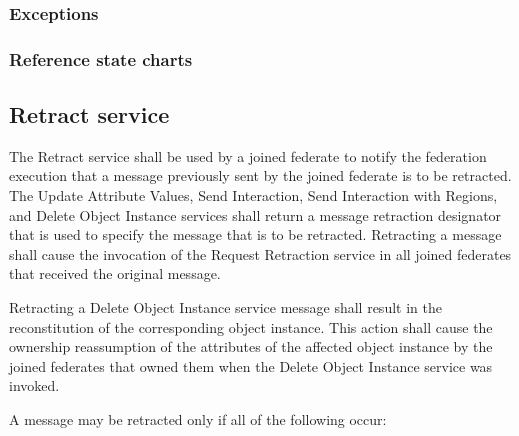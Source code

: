 \begin{compactstdpage}

    \subsubsection{Exceptions}


    \subsubsection{Reference state charts}


    \subsection{Retract service}

    The Retract service shall be used by a joined federate to notify the federation execution that a message previously sent by the joined federate is to be retracted. The Update Attribute Values, Send Interaction, Send Interaction with Regions, and Delete Object Instance services shall return a message retraction designator that is used to specify the message that is to be retracted. Retracting a message shall cause the invocation of the Request Retraction \rtiinitiated{} service in all joined federates that received the original message.

    Retracting a Delete Object Instance service message shall result in the reconstitution of the corresponding object instance. This action shall cause the ownership reassumption of the attributes of the affected object instance by the joined federates that owned them when the Delete Object Instance service was invoked.

    A message may be retracted only if all of the following occur:



\end{compactstdpage}
